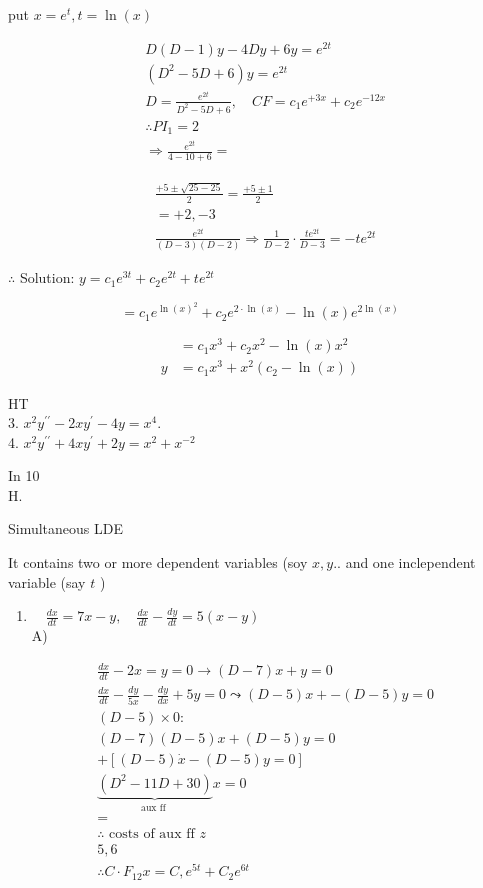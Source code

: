 \documentclass[12pt, a4paper]{article}
\begin{document}
put $x=e^{t}, t=\ln (x)$

$$
\begin{aligned}
& D(D-1) y-4 D y+6 y=e^{2 t} \\
& \left(D^{2}-5 D+6\right) y=e^{2 t} \\
& D=\frac{e^{2 t}}{D^{2}-5 D+6}, \quad C F=c_{1} e^{+3 x}+c_{2} e^{-12 x} \\
& \therefore P I_{1}=2 \\
& \Rightarrow \frac{e^{2 t}}{4-10+6}=
\end{aligned}
$$

$$
\begin{aligned}
& \frac{+5 \pm \sqrt{25-25}}{2}=\frac{+5 \pm 1}{2} \\
& =+2,-3 \\
& \frac{e^{2 t}}{(D-3)(D-2)} \Rightarrow \frac{1}{D-2} \cdot \frac{t e^{2 t}}{D-3}=-t e^{2 t}
\end{aligned}
$$

$\therefore$ Solution: $y=c_{1} e^{3 t}+c_{2} e^{2 t}+t e^{2 t}$

$$
=c_{1} e^{\ln (x)^{2}}+c_{2} e^{2 \cdot \ln (x)}-\ln (x) e^{2 \ln (x)}
$$

$$
\begin{aligned}
& =c_{1} x^{3}+c_{2} x^{2}-\ln (x) x^{2} \\
y & =c_{1} x^{3}+x^{2}\left(c_{2}-\ln (x)\right)
\end{aligned}
$$

HT\\
3. $x^{2} y^{\prime \prime}-2 x y^{\prime}-4 y=x^{4}$.\\
4. $x^{2} y^{\prime \prime}+4 x y^{\prime}+2 y=x^{2}+x^{-2}$

In 10\\
H.

Simultaneous LDE

It contains two or more dependent variables (soy $x, y .$. and one inclependent variable (say $t$ )

\begin{enumerate}
  \item $\quad \frac{d x}{d t}=7 x-y, \quad \frac{d x}{d t}-\frac{d y}{d t}=5(x-y)$\\
A)
\end{enumerate}


\begin{align*}
& \frac{d x}{d t}-2 x=y=0 \rightarrow(D-7) x+y=0  \tag{1}\\
& \frac{d x}{d t}-\frac{d y}{5 x}-\frac{d y}{d x}+5 y=0 \leadsto(D-5) x+-(D-5) y=0  \tag{2}\\
& (D-5) \times 0: \\
& (D-7)(D-5) x+(D-5) y=0 \\
& +[(D-5) \dot{x}-(D-5) y=0] \\
& \underbrace{\left(D^{2}-11 D+30\right)}_{\text {aux ff }} x=0 \\
& = \\
& \therefore \text { costs of aux ff } z \\
& 5,6 \\
& \therefore C \cdot F_{12} x=C, e^{5 t}+C_{2} e^{6 t}
\end{align*}
\end{document}
